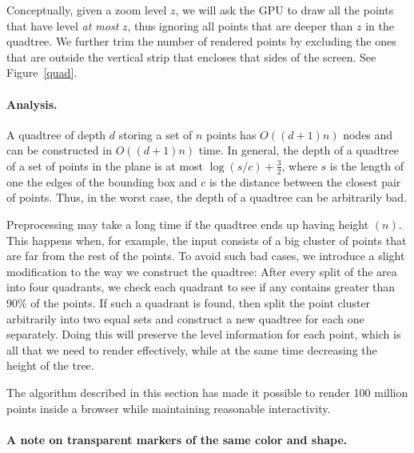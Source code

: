 \documentclass[11pt,a4paper]{article}
\begin{document}
Conceptually, given a zoom level $z$, we will ask the GPU to draw all the points that have level \emph{at most} $z$, thus ignoring
all points that are deeper than $z$ in the quadtree. 
We further trim the number of rendered points by excluding the ones that are outside the vertical strip 
that encloses that sides of the screen. See Figure~\ref{quad}.


\paragraph{Analysis.}

A quadtree of depth $d$ storing a set of $n$ points has $O((d + 1)n)$ nodes and can be constructed in $O((d + 1)n)$ time.
In general, the depth of a quadtree of a set of points in the plane is at most $\log (s/c) + \frac{3}{2}$, 
where $s$ is the length of one the edges of the bounding box and $c$ is the distance between 
the closest pair of points. Thus, in the worst case, the depth of a quadtree can be arbitrarily bad. 

Preprocessing may take a long time if the quadtree ends up having height $(n)$.
This happens when, for example, the input consists of a big cluster of points that are far from the rest of the
points. To avoid such bad cases, we introduce a slight modification to the way we construct the quadtree:
After every split of the area into four quadrants, we check each quadrant to see if any contains greater
than 90\% of the points. If such a quadrant is found, then split the point cluster arbitrarily into two equal sets and
construct a new quadtree for each one separately.
Doing this will preserve the level information for each point, which is all that we need to render effectively,
while at the same time decreasing the height of the tree.

The algorithm described in this section has made it possible to render 100 million points inside a browser while maintaining
reasonable interactivity.



\paragraph{A note on transparent markers of the same color and shape.}
\end{document}
